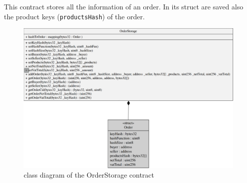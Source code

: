 \noindent This contract stores all the information of an order. In its struct are saved also the product keys (\texttt{productsHash}) of the order.
\begin{figure}[H]
	\centering
	\includegraphics[scale=0.35]{res/images/solidity/orderstorage.png}
	\caption{class diagram of the OrderStorage contract}
\end{figure}